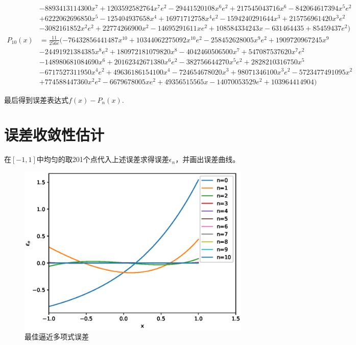 \documentclass{article}
\begin{document}
\begin{align*}
    	& - 8893413114300 x^{7} + 1203592582764 x^{7} e^{2} - 29441520108 x^{6} e^{2} + 217545043716 x^{6} - 842064617394 x^{5} e^{2} \\
    	&+ 6222062696850 x^{5} - 125404937658 x^{4} + 16971712758 x^{4} e^{2} - 1594240291644 x^{3} + 215756961420 x^{3} e^{2}\\
    	& - 3082161852 x^{2} e^{2} + 22774266900 x^{2} - 14695291611 x e^{2} + 108584334243 x - 631464435 + 85459437 e^{2})\\
    	P_{10}(x) &=\frac{11}{256 e}(- 76432856441487 x^{10} + 10344062275092 x^{10} e^{2} - 258452628005 x^{9} e^{2} + 1909720967245 x^{9}\\
    	& - 24491921384385 x^{8} e^{2} + 180972181079820 x^{8} - 4042460506500 x^{7} + 547087537620 x^{7} e^{2}\\
    	& - 148980681084690 x^{6} + 20162342671380 x^{6} e^{2} - 382756644270 x^{5} e^{2} + 2828210316750 x^{5} \\
    	&- 6717527311950 x^{4} e^{2} + 49636186154100 x^{4} - 724654678020 x^{3} + 98071346100 x^{3} e^{2} - 5723477491095 x^{2} \\
    	&+ 774588447360 x^{2} e^{2} - 6679678005 x e^{2} + 49356515565 x - 14070053529 e^{2} + 103964414904)
    \end{align*}
    
    最后得到误差表达式$f(x)-P_n(x)$.
    
    \section{误差收敛性估计}
    在$[-1,1]$中均匀的取201个点代入上述误差求得误差$\epsilon_n$，并画出误差曲线。
    \begin{figure}[H]
        \centering
        \includegraphics[width = 12cm]{epsilon.eps}
        \caption{最佳逼近多项式误差}
    \end{figure}
	
\end{document}
